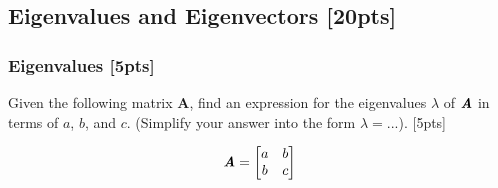 \documentclass{article}
\begin{document}
\newpage



\subsection{Eigenvalues and Eigenvectors [20pts]}
\subsubsection{Eigenvalues [5pts]}
Given the following matrix $\boldsymbol{A}$, find an expression for the eigenvalues $\lambda$ of $\textbf{\textit{A}}$ in terms of $a$, $b$, and $c$. \newline (Simplify your answer into the form $\lambda = ...$). [5pts] 

$$\textbf{\textit{A}}=\begin{bmatrix}
    a & b \\
    b & c
\end{bmatrix}$$
\end{document}
